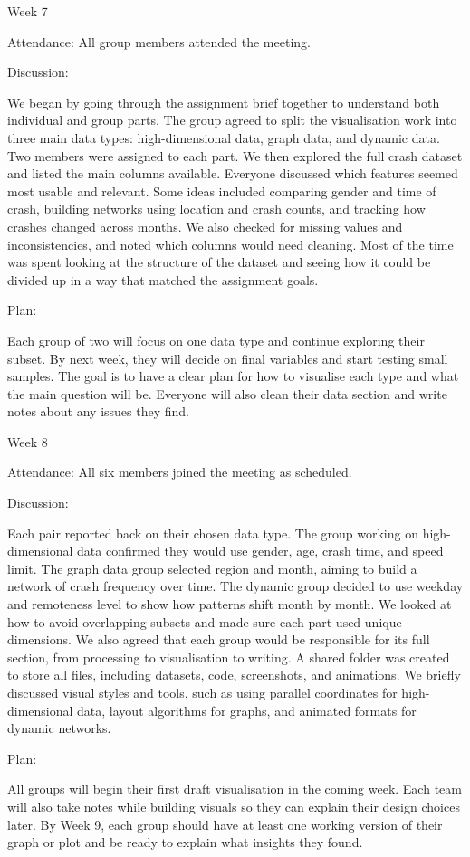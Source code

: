 \noindent

Week 7

Attendance:
All group members attended the meeting.

Discussion:

We began by going through the assignment brief together to understand both individual and group parts. The group agreed to split the visualisation work into three main data types: high-dimensional data, graph data, and dynamic data. Two members were assigned to each part. We then explored the full crash dataset and listed the main columns available. Everyone discussed which features seemed most usable and relevant. Some ideas included comparing gender and time of crash, building networks using location and crash counts, and tracking how crashes changed across months. We also checked for missing values and inconsistencies, and noted which columns would need cleaning. Most of the time was spent looking at the structure of the dataset and seeing how it could be divided up in a way that matched the assignment goals.


Plan:

Each group of two will focus on one data type and continue exploring their subset. By next week, they will decide on final variables and start testing small samples. The goal is to have a clear plan for how to visualise each type and what the main question will be. Everyone will also clean their data section and write notes about any issues they find.

\noindent

Week 8

Attendance:
All six members joined the meeting as scheduled.

Discussion:

Each pair reported back on their chosen data type. The group working on high-dimensional data confirmed they would use gender, age, crash time, and speed limit. The graph data group selected region and month, aiming to build a network of crash frequency over time. The dynamic group decided to use weekday and remoteness level to show how patterns shift month by month. We looked at how to avoid overlapping subsets and made sure each part used unique dimensions. We also agreed that each group would be responsible for its full section, from processing to visualisation to writing. A shared folder was created to store all files, including datasets, code, screenshots, and animations. We briefly discussed visual styles and tools, such as using parallel coordinates for high-dimensional data, layout algorithms for graphs, and animated formats for dynamic networks.

Plan:

All groups will begin their first draft visualisation in the coming week. Each team will also take notes while building visuals so they can explain their design choices later. By Week 9, each group should have at least one working version of their graph or plot and be ready to explain what insights they found.